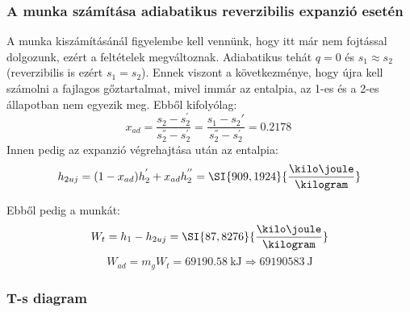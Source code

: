 \subsubsection{A munka számítása adiabatikus reverzibilis expanzió esetén}
A munka kiszámításánál figyelembe kell vennünk, hogy itt már nem fojtással dolgozunk, ezért a feltételek megváltoznak. Adiabatikus tehát $q = 0$ és $s_{1}\approx s_{2}$ (reverzibilis is ezért $s_{1} = s_{2}$). Ennek viszont a következménye, hogy újra kell számolni a fajlagos gőztartalmat, mivel immár az entalpia, az 1-es és a 2-es állapotban nem egyezik meg.
Ebből kifolyólag:
\begin{equation}
	x_{ad} =
	\dfrac{s_{2} - s_{2}^{'}}{s_{2}^{''} - s_{2}^{'}} 
	=
	\dfrac{s_{1} - s_{2}{'}}{s_{2}^{''} - s_{2}^{'}}
	=
	\SI{0,2178}{}
\end{equation}
Innen pedig az expanzió végrehajtása után az entalpia:
\begin{equation}
	h_{2uj} = (1 - x_{ad})h_{2}^{'} + x_{ad}h_{2}^{''}
	=
	\SI{909,1924}{\dfrac{\kilo\joule}{\kilogram}}
\end{equation}

\noindent Ebből pedig a munkát:
\begin{equation}
	W_{t} = h_{1} - h_{2uj}
	=
	\SI{87,8276}{\dfrac{\kilo\joule}{\kilogram}}
\end{equation}
\begin{equation}
	W_{ad} = m_{g}W_{t} = \SI{69190,58}{\kilo\joule} \Rightarrow \SI{69190583}{\joule}
\end{equation}
\subsubsection{T-s diagram}